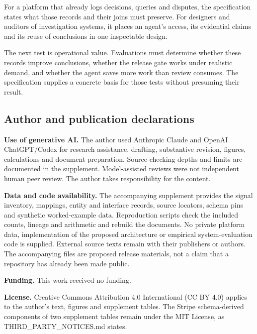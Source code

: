 \documentclass[
  11pt,
]{article}
\begin{document}
For a platform that already logs decisions, queries and disputes, the
specification states what those records and their joins must preserve.
For designers and auditors of investigation systems, it places an
agent's access, its evidential claims and its reuse of conclusions in
one inspectable design.

The next test is operational value. Evaluations must determine whether
these records improve conclusions, whether the release gate works under
realistic demand, and whether the agent saves more work than review
consumes. The specification supplies a concrete basis for those tests
without presuming their result.

\FloatBarrier

\hypertarget{author-and-publication-declarations}{%
\subsection{Author and publication
declarations}\label{author-and-publication-declarations}}

\suppressfloats[t]

\textbf{Use of generative AI.} The author used Anthropic Claude and
OpenAI ChatGPT/Codex for research assistance, drafting, substantive
revision, figures, calculations and document preparation.
Source-checking depths and limits are documented in the supplement.
Model-assisted reviews were not independent human peer review. The
author takes responsibility for the content.

\textbf{Data and code availability.} The accompanying supplement
provides the signal inventory, mappings, entity and interface records,
source locators, schema pins and synthetic worked-example data.
Reproduction scripts check the included counts, lineage and arithmetic
and rebuild the documents. No private platform data, implementation of
the proposed architecture or empirical system-evaluation code is
supplied. External source texts remain with their publishers or authors.
The accompanying files are proposed release materials, not a claim that
a repository has already been made public.

\textbf{Funding.} This work received no funding.

\textbf{License.} Creative Commons Attribution 4.0 International (CC BY
4.0) applies to the author's text, figures and supplement tables. The
Stripe schema-derived components of two supplement tables remain under
the MIT License, as THIRD\_PARTY\_NOTICES.md states.
\end{document}
